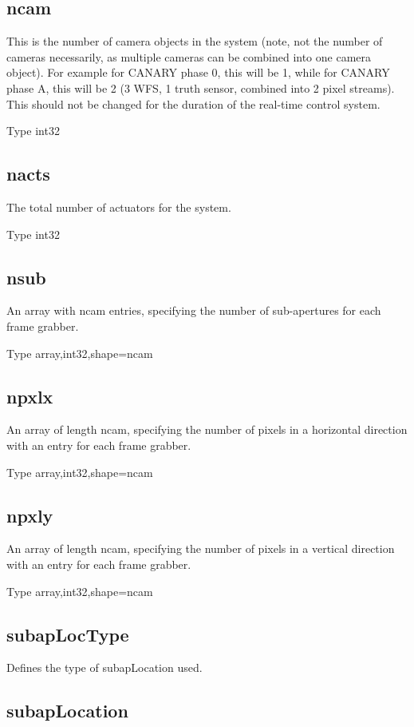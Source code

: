 \documentclass[a4,10pt]{article}
\begin{document}
\subsection{ncam}
This is the number of camera objects in the system (note, not
the number of cameras necessarily, as multiple cameras can be combined
into one camera object).  For example for CANARY phase 0, this will be
1, while for CANARY phase A, this will be 2 (3 WFS, 1 truth sensor,
combined into 2 pixel streams).  This should not be changed for the
duration of the real-time control system.

Type int32

\subsection{nacts}
The total number of actuators for the system.  

Type int32

\subsection{nsub}
An array with ncam entries, specifying the number of sub-apertures for
each frame grabber.

Type array,int32,shape=ncam

\subsection{npxlx}
An array of length ncam, specifying the number of pixels in a
horizontal direction with an entry for each frame grabber.

Type array,int32,shape=ncam

\subsection{npxly}
An array of length ncam, specifying the number of pixels in a
vertical direction with an entry for each frame grabber.

Type array,int32,shape=ncam



\subsection{subapLocType}
Defines the type of subapLocation used.


\subsection{subapLocation}
\end{document}
